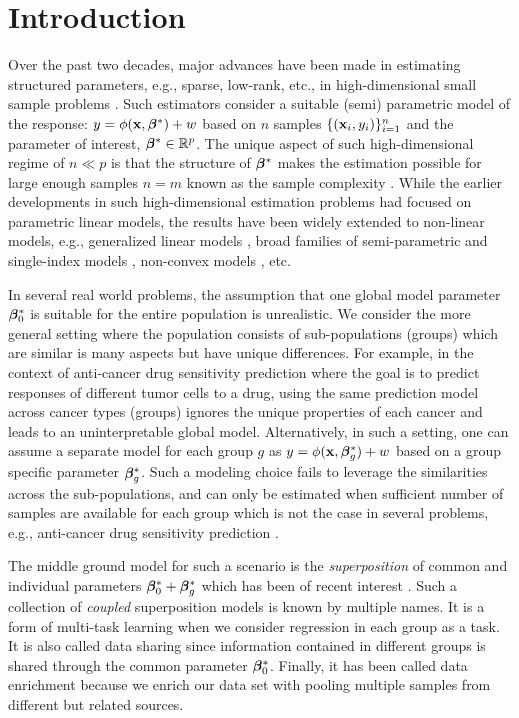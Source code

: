 \section{Introduction}
Over the past two decades, major advances have been made in estimating structured parameters, e.g., sparse, low-rank, etc., in high-dimensional small sample problems \cite{candes2010power, donoho2006compressed, friedman2008sparse}. Such estimators consider a suitable (semi) parametric model of the response: $y = \phi(\mathbf{x},\boldsymbol{\beta}^*) + w$ based on $n$ samples $\{(\mathbf{x}_i,y_i)\}_{i=1}^n$ and the parameter of interest, $\boldsymbol{\beta}^* \in \mathbb R^p$. The unique aspect of such high-dimensional regime of $n \ll p$ is that the structure of $\boldsymbol{\beta}^*$ makes
the estimation possible for large enough samples $n = m$ known as the sample complexity \cite{candes2009exact, candes2006robust, tibshirani1996regression}. While the earlier developments in such high-dimensional estimation problems had focused on parametric linear models, the results have been widely extended to non-linear models, e.g., generalized linear models \cite{bach2012optimization, negahban2009unified}, broad families of semi-parametric and single-index models \cite{boufounos20081, plan2017high}, non-convex models \cite{blumensath2009iterative,jain2013low}, etc.

In several real world problems, the assumption that one global model parameter $\boldsymbol{\beta}_0^*$ is suitable for the entire population is unrealistic.
We consider the more general setting where the population consists of sub-populations (groups) which are similar is many aspects but have unique differences. For example, in the context of anti-cancer drug sensitivity prediction where the goal is to predict responses of different tumor cells to a drug, using the same prediction model across cancer types (groups) ignores the unique properties of each cancer and leads to an uninterpretable global model. Alternatively, in such a setting, one can assume a separate model for each group $g$ as $y = \phi(\mathbf{x}, \boldsymbol{\beta}_g^*) + w$ based on a group specific parameter $\boldsymbol{\beta}^*_g$. Such a modeling choice fails to leverage the similarities across the sub-populations, and can only be estimated when sufficient number of samples are available for each group which is not the case in several problems, e.g., anti-cancer drug sensitivity prediction \cite{barretina2012cancer, iorio2016landscape1}.

The middle ground model for such a scenario is the \emph{superposition} of common and individual parameters $\boldsymbol{\beta}_0^* + \boldsymbol{\beta}_g^*$ which has been of recent interest \cite{guba16, mctr13, Yang2013-pf}. Such a collection of \emph{coupled} superposition models is known by multiple names.
It is a form of multi-task learning \cite{jrsr10, Zhang2017-rm} when we consider regression in each group as a task. It is also called data sharing \cite{grti16} since information contained in different groups is shared through the common parameter $\boldsymbol{\beta}_0^*$. Finally, it has been called data enrichment \cite{asiaee2018high, asiaeedata, Chen2015-fj} because we enrich our data set with pooling multiple samples from different but related sources. 


